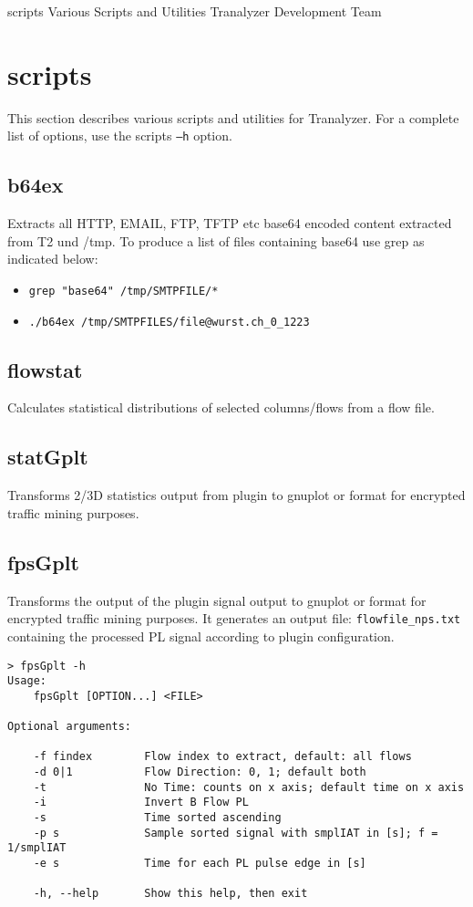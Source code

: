 \documentclass[documentation]{subfiles}
\begin{document}
\trantitle
    {scripts}
    {Various Scripts and Utilities}
    {Tranalyzer Development Team} %

\section{scripts}\label{s:scripts}
This section describes various scripts and utilities for Tranalyzer.
For a complete list of options, use the scripts {\tt --h} option.

\subsection{b64ex}
Extracts all HTTP, EMAIL, FTP, TFTP etc base64 encoded content extracted from T2 und /tmp.
To produce a list of files containing base64 use grep as indicated below:
\begin{itemize}
    \item {\tt grep "base64" /tmp/SMTPFILE/*}
    \item {\tt ./b64ex /tmp/SMTPFILES/file@wurst.ch\_0\_1223}
\end{itemize}

\subsection{flowstat}
Calculates statistical distributions of selected columns/flows from a flow file.

\subsection{statGplt}
Transforms 2/3D statistics output from  plugin to gnuplot or  format for encrypted traffic mining purposes.

\subsection{fpsGplt}
Transforms the output of the  plugin signal output to gnuplot or  format for encrypted traffic mining purposes.
It generates an output file: {\tt flowfile\_nps.txt} containing the processed PL signal according to  plugin configuration.

\begin{center}
   \begin{verbatim}
> fpsGplt -h
Usage:
    fpsGplt [OPTION...] <FILE>

Optional arguments:

    -f findex        Flow index to extract, default: all flows
    -d 0|1           Flow Direction: 0, 1; default both
    -t               No Time: counts on x axis; default time on x axis
    -i               Invert B Flow PL
    -s               Time sorted ascending
    -p s             Sample sorted signal with smplIAT in [s]; f = 1/smplIAT
    -e s             Time for each PL pulse edge in [s]

    -h, --help       Show this help, then exit
\end{verbatim}
\end{center}
\end{document}
